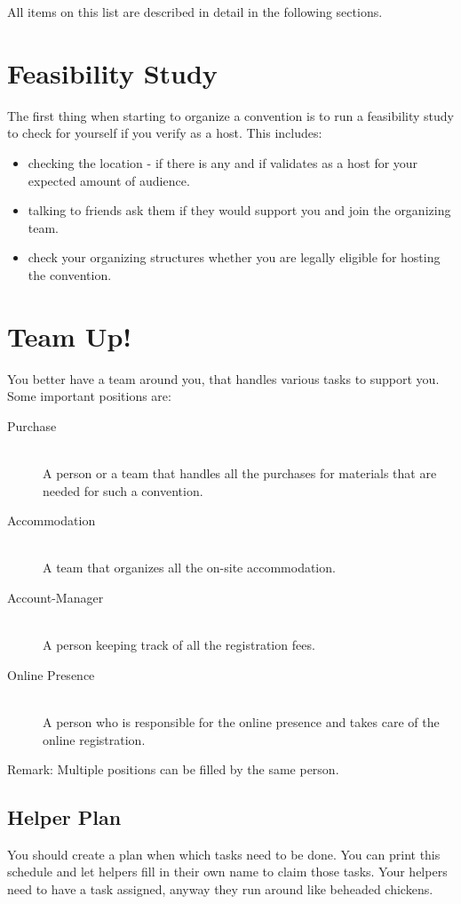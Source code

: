 \documentclass[11pt]{report}
\begin{document}
All items on this list are described in detail in the following sections.

\section{Feasibility Study}

The first thing when starting to organize a convention is to run a feasibility 
study to check for yourself if you verify as a host. This includes:

\begin{itemize}
	\item checking the location - if there is any and if validates as a host for 
	your expected amount of audience.
	\item talking to friends ask them if they would support you and join the 
	organizing team.
	\item check your organizing structures whether you are legally eligible for 
	hosting the convention.
\end{itemize}

\section{Team Up!}

You better have a team around you, that handles various tasks to support you. 
Some important positions are:

\begin{description}
	\item [Purchase] \hfill \\
	A person or a team that handles all the purchases for materials that are needed 
	for such a convention.
	\item [Accommodation] \hfill \\
	A team that organizes all the on-site accommodation.
	\item [Account-Manager] \hfill \\
	A person keeping track of all the registration fees.
	\item [Online Presence] \hfill \\
	A person who is responsible for the online presence and takes care of the 
	online registration.
\end{description}
Remark: Multiple positions can be filled by the same person.

\subsection{Helper Plan}
You should create a plan when which tasks need to be done. You can print this 
schedule and let helpers fill in their own name to claim those tasks. Your 
helpers need to have a task assigned, anyway they run around like beheaded 
chickens.
\end{document}

